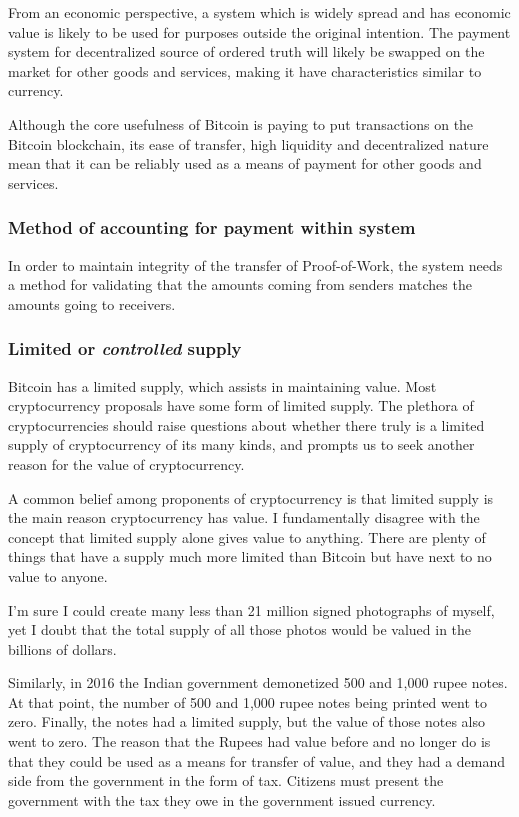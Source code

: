 \documentclass[a4paper,12pt]{article}
\begin{document}
From an economic perspective, a system which is widely spread and has economic value is likely to be used for purposes outside the original intention. The payment system for decentralized source of ordered truth will likely be swapped on the market for other goods and services, making it have characteristics similar to currency.

Although the core usefulness of Bitcoin is paying to put transactions on the Bitcoin blockchain, its ease of transfer, high liquidity and decentralized nature mean that it can be reliably used as a means of payment for other goods and services.

\subsubsection{Method of accounting for payment within system}
In order to maintain integrity of the transfer of Proof-of-Work, the system needs a method for validating that the amounts coming from senders matches the amounts going to receivers. 

\subsubsection{Limited or \textit{controlled} supply}
Bitcoin has a limited supply, which assists in maintaining value. Most cryptocurrency proposals have some form of limited supply. The plethora of cryptocurrencies should raise questions about whether there truly is a limited supply of cryptocurrency of its many kinds, and prompts us to seek another reason for the value of cryptocurrency.

A common belief among proponents of cryptocurrency is that limited supply is the main reason cryptocurrency has value. I fundamentally disagree with the concept that limited supply alone gives value to anything. There are plenty of things that have a supply much more limited than Bitcoin but have next to no value to anyone. 

I'm sure I could create many less than 21 million signed photographs of myself, yet I doubt that the total supply of all those photos would be valued in the billions of dollars.

Similarly, in 2016 the Indian government demonetized 500 and 1,000 rupee notes. At that point, the number of 500 and 1,000 rupee notes being printed went to zero. Finally, the notes had a limited supply, but the value of those notes also went to zero. The reason that the Rupees had value before and no longer do is that they could be used as a means for transfer of value, and they had a demand side from the government in the form of tax. Citizens must present the government with the tax they owe in the government issued currency.
\end{document}
